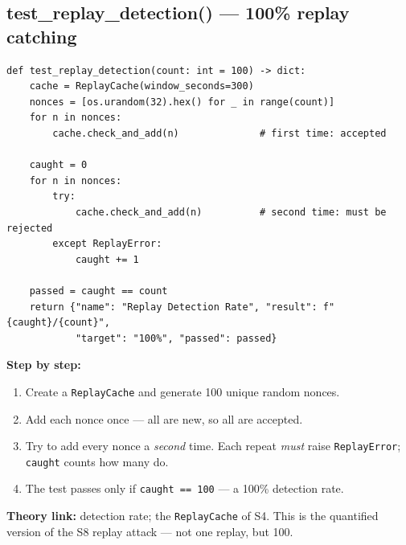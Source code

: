 \documentclass[11pt,a4paper]{report}
\begin{document}
\subsection{test\_replay\_detection() --- 100\% replay catching}
\begin{lstlisting}[style=py,caption={evaluate\_security.py --- the replay detection test.}]
def test_replay_detection(count: int = 100) -> dict:
    cache = ReplayCache(window_seconds=300)
    nonces = [os.urandom(32).hex() for _ in range(count)]
    for n in nonces:
        cache.check_and_add(n)              # first time: accepted

    caught = 0
    for n in nonces:
        try:
            cache.check_and_add(n)          # second time: must be rejected
        except ReplayError:
            caught += 1

    passed = caught == count
    return {"name": "Replay Detection Rate", "result": f"{caught}/{count}",
            "target": "100%", "passed": passed}
\end{lstlisting}
\textbf{Step by step:}
\begin{enumerate}
  \item Create a \texttt{ReplayCache} and generate 100 unique random nonces.
  \item Add each nonce once --- all are new, so all are accepted.
  \item Try to add every nonce a \emph{second} time. Each repeat \emph{must}
        raise \texttt{ReplayError}; \texttt{caught} counts how many do.
  \item The test passes only if \texttt{caught == 100} --- a 100\% detection rate.
\end{enumerate}
\textbf{Theory link:} detection rate; the \texttt{ReplayCache} of S4. This is the
quantified version of the S8 replay attack --- not one replay, but 100.
\end{document}
